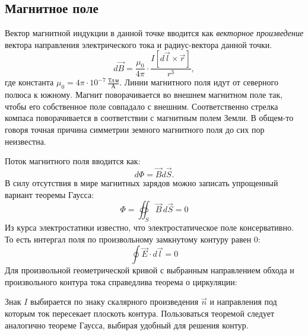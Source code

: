 \subsection{Магнитное поле}

Вектор магнитной индукции в данной точке вводится как \textit{векторное произведение} вектора направления электрического тока и радиус-вектора данной точки. 
\begin{equation}
	d \vec{B} = \frac{\mu_0}{4\pi} \cdot \frac{I[d \vec{l}\times\vec{r}]}{r^3},
	\label{eq:BSL-law}
\end{equation}
где константа $\mu_{0} = 4 \pi \cdot 10^{-7} \, \frac{\text{Тл} \, \text{м}}{\text{А}}$. Линии магнитного поля идут от северного полюса к южному. Магнит поворачивается во внешнем магнитном поле так, чтобы его собственное поле совпадало с внешним. Соответственно стрелка компаса поворачивается в соответствии с магнитным полем Земли. В общем-то говоря точная причина симметрии земного магнитного поля до сих пор неизвестна.

Поток магнитного поля вводится как:
\begin{equation}
	d\Phi = \vec{B}d\vec{S}.
\end{equation}
В силу отсутствия в мире магнитных зарядов можно записать упрощенный вариант теоремы Гаусса:
\begin{equation}
    \Phi = \oiint_{S}{\Vec{B} \, d\Vec{S}} = 0
\end{equation}
Из курса электростатики известно, что электростатическое поле консервативно. То есть интергал поля по произвольному замкнутому контуру равен 0:
\begin{equation*}
    \oint{\Vec{E} \cdot d \Vec{l}} = 0
\end{equation*}
Для произвольной геометрической кривой с выбранным направлением обхода и произвольного контура тока справедлива теорема о циркуляции:
\begin{center}
\end{center}
Знак $I$ выбирается по знаку скалярного произведения $\Vec{n}$ и направления под которым ток пересекает плоскоть контура. Пользоваться теоремой следует аналогично теореме Гаусса, выбирая удобный для решения контур. 